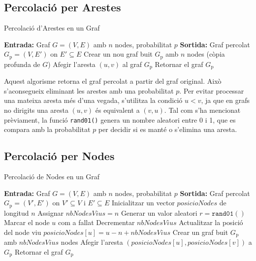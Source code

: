 \documentclass[a4paper]{article}
\begin{document}
	\subsection{Percolació per Arestes}
	\begin{algorithm} [H]
		\caption{Percolació d'Arestes en un Graf}
		\begin{algorithmic} [1]
			\Statex \textbf{Entrada:} Graf $G = (V, E)$ amb $n$ nodes, probabilitat $p$
			\Statex \textbf{Sortida:} Graf percolat $G_{\text{p}} = (V, E')$ on $E' \subseteq E$
			\Statex \vspace{-0.25em}
			\State Crear un nou graf buit $G_{\text{p}}$ amb $n$ nodes (còpia profunda de $G$)
						\State Afegir l'aresta $(u, v)$ al graf $G_{\text{p}}$
					\EndIf
				\EndFor
			\EndFor
			\State Retornar el graf $G_{\text{p}}$
		\end{algorithmic}
	\end{algorithm}

	Aquest algorisme retorna el graf percolat a partir del graf original. Això s'aconsegueix eliminant les arestes amb una probabilitat \( p \). Per evitar processar una mateixa aresta més d'una vegada, s'utilitza la condició \( u < v \), ja que en grafs no dirigits una aresta \( (u, v) \) és equivalent a \( (v, u) \). Tal com s'ha mencionat prèviament, la funció \texttt{rand01()} genera un nombre aleatori entre 0 i 1, que es compara amb la probabilitat \( p \) per decidir si es manté o s'elimina una aresta.

	\subsection{Percolació per Nodes}
	\begin{algorithm} [H]
		\caption{Percolació de Nodes en un Graf}
		\begin{algorithmic} [1]
			\Statex \textbf{Entrada:} Graf $G = (V, E)$ amb $n$ nodes, probabilitat $p$
			\Statex \textbf{Sortida:} Graf percolat $G_{\text{p}} = (V', E')$ on $V' \subseteq V$ i $E' \subseteq E$
			\Statex \vspace{-0.25em}
			\State Inicialitzar un vector $posicioNodes$ de longitud $n$
			\State Assignar $nbNodesVius = n$
				\State Generar un valor aleatori $r = \texttt{rand01}()$
					\State Marcar el node $u$ com a fallat
					\State Decrementar $nbNodesVius$
				\Else
					\State Actualitzar la posició del node viu $posicioNodes[u] = u - n + nbNodesVius$
				\EndIf
			\EndFor
			\Statex
			\State Crear un graf buit $G_{\text{p}}$ amb $nbNodesVius$ nodes
							\State Afegir l'aresta $(posicioNodes[u], posicioNodes[v])$ a $G_{\text{p}}$
						\EndIf
					\EndFor
				\EndIf
			\EndFor
			\State Retornar el graf $G_{\text{p}}$
		\end{algorithmic}
	\end{algorithm}
\end{document}
